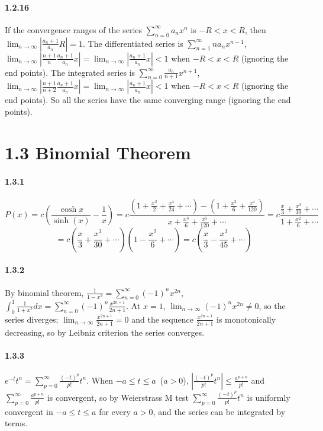 \documentclass[a4paper]{article}
\begin{document}
\paragraph{1.2.16}
If the convergence ranges of the series $\sum_{n=0}^\infty a_n x^n$ is $-R<x<R$, then $\lim_{n\to\infty}\left|\frac{a_n+1}{a_n}R\right|=1$. The differentiated series is $\sum_{n=1}^\infty na_nx^{n-1}$, $\lim_{n\to\infty}\left|\frac{n+1}{n}\frac{a_n+1}{a_n}x\right|=\lim_{n\to\infty}\left|\frac{a_n+1}{a_n}x\right|<1$ when $-R<x<R$ (ignoring the end points). The integrated series is $\sum_{n=0}^\infty\frac{a_n}{n+1}x^{n+1}$, $\lim_{n\to\infty}\left|\frac{n+1}{n+2}\frac{a_n+1}{a_n}x\right|=\lim_{n\to\infty}\left|\frac{a_n+1}{a_n}x\right|<1$ when $-R<x<R$ (ignoring the end points). So all the series have the same converging range (ignoring the end points).

\section*{1.3 Binomial Theorem}

\paragraph{1.3.1}
\[P(x)=c\left(\frac{\cosh{x}}{\sinh(x)}-\frac{1}{x} \right)=c\frac{(1+\frac{x^2}{2}+\frac{x^4}{24}+\cdots)-(1+\frac{x^3}{6}+\frac{x^4}{120})}{x+\frac{x^3}{6}+\frac{x^5}{120}+\cdots}=c\frac{\frac{x}{3}+\frac{x^3}{30}+\cdots}{1+\frac{x^2}{6}+\cdots}\]
\[=c(\frac{x}{3}+\frac{x^3}{30}+\cdots)(1-\frac{x^2}{6}+\cdots)=c\left(\frac{x}{3}-\frac{x^3}{45}+\cdots\right)\]

\paragraph{1.3.2}
By binomial theorem, $\frac{1}{1-x^2}=\sum_{n=0}^\infty(-1)^n x^{2n}$, $\int_0^1\frac{1}{1+x^2}dx=\sum_{n=0}^\infty(-1)^n\frac{x^{2n+1}}{2n+1}$. At $x=1$, $\lim_{n\to\infty}(-1)^n x^{2n}\neq 0$, so the series diverges; $\lim_{n\to\infty}\frac{x^{2n+1}}{2n+1}=0$ and the sequence $\frac{x^{2n+1}}{2n+1}$ is monotonically decreasing, so by Leibniz criterion the series converges. 

\paragraph{1.3.3}
$e^{-t}t^n=\sum_{p=0}^\infty\frac{(-t)^p}{p!}t^n$. When $-a\leq t\leq a$ \,($a>0$), $\left|\frac{(-t)^p}{p!}t^n\right|\leq\frac{a^{p+n}}{p!}$ and $\sum_{p=0}^\infty\frac{a^{p+n}}{p!}$ is convergent, so by Weierstrass M test $\sum_{p=0}^\infty\frac{(-t)^p}{p!}t^n$ is uniformly convergent in $-a\leq t\leq a$ for every $a>0$, and the series can be integrated by terms.
\end{document}
